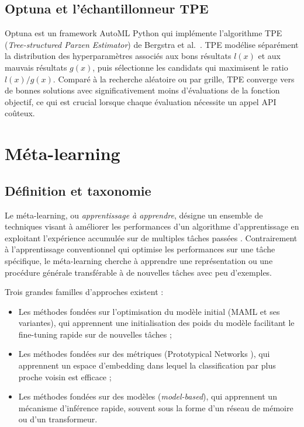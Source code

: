 \subsection{Optuna et l'échantillonneur TPE}

Optuna \cite{akiba2019optuna} est un framework AutoML Python qui implémente
l'algorithme TPE (\textit{Tree-structured Parzen Estimator}) de Bergstra et
al.\ \cite{bergstra2011algorithms}. TPE modélise séparément la distribution
des hyperparamètres associés aux bons résultats $l(x)$ et aux mauvais résultats
$g(x)$, puis sélectionne les candidats qui maximisent le ratio $l(x)/g(x)$.
Comparé à la recherche aléatoire ou par grille, TPE converge vers de bonnes
solutions avec significativement moins d'évaluations de la fonction objectif,
ce qui est crucial lorsque chaque évaluation nécessite un appel API coûteux.

\section{Méta-learning}

\subsection{Définition et taxonomie}

Le méta-learning, ou \textit{apprentissage à apprendre}, désigne un ensemble
de techniques visant à améliorer les performances d'un algorithme d'apprentissage
en exploitant l'expérience accumulée sur de multiples tâches passées
\cite{vanschoren2018meta}. Contrairement à l'apprentissage conventionnel qui
optimise les performances sur une tâche spécifique, le méta-learning cherche à
apprendre une représentation ou une procédure générale transférable à de
nouvelles tâches avec peu d'exemples.

Trois grandes familles d'approches existent :
\begin{itemize}
  \item Les méthodes fondées sur l'optimisation du modèle initial (MAML
    \cite{finn2017model} et ses variantes), qui apprennent une initialisation
    des poids du modèle facilitant le fine-tuning rapide sur de nouvelles tâches ;
  \item Les méthodes fondées sur des métriques (Prototypical Networks
    \cite{snell2017prototypical}), qui apprennent un espace d'embedding dans
    lequel la classification par plus proche voisin est efficace ;
  \item Les méthodes fondées sur des modèles (\textit{model-based}), qui apprennent
    un mécanisme d'inférence rapide, souvent sous la forme d'un réseau de
    mémoire ou d'un transformeur.
\end{itemize}

